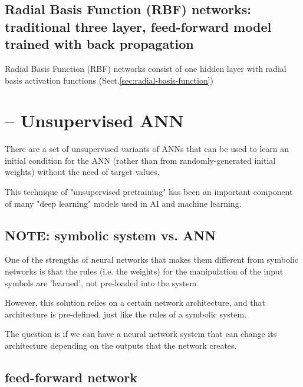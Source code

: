 \subsection{Radial Basis Function (RBF) networks: traditional three layer,
feed-forward model trained with back propagation}
\label{sec:RBF-network}

Radial Basis Function (RBF) networks consist of one hidden layer with radial
basis activation functions (Sect.\ref{sec:radial-basis-function})


\section{-- Unsupervised ANN}
\label{sec:ANN-unsupervised}


There are a set of unsupervised variants of ANNs that can be used to learn an
initial condition for the ANN (rather than from randomly-generated initial
weights) without the need of target values.

This technique of "unsupervised pretraining" has been an important component of
many "deep learning" models used in AI and machine learning. 

\subsection{NOTE: symbolic system vs. ANN}

One of the strengths of neural networks that makes them different from symbolic
networks is that the rules (i.e. the weights) for the manipulation of the input
symbols are 'learned', not pre-loaded into the system.

However, this solution relies on a certain network architecture, and that
architecture is pre-defined, just like the rules of a symbolic system.

The question is if we can have a neural network system that can change its
architecture depending on the outputs that the network creates.

\subsection{feed-forward network}
\label{sec:feed-forward-network}

